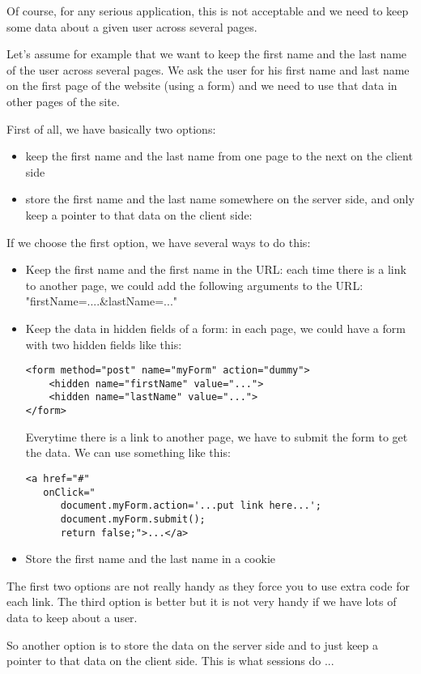 \documentclass{manual}
\begin{document}
Of course, for any serious application, this is not acceptable and we need to keep some data about a given user across
several pages.

Let's assume for example that we want to keep the first name and the last name of the user across several pages. We ask the
user for his first name and last name on the first page of the website (using a form) and we need to use that data in other
pages of the site.

First of all, we have basically two options:
\begin{itemize}
\item
keep the first name and the last name from one page to the next on the client side
\item
store the first name and the last name somewhere on the server side, and only keep
a pointer to that data on the client side: 
\end{itemize}

If we choose the first option, we have several ways to do this:
\begin{itemize}
\item
    Keep the first name and the first name in the URL: each time there is a link to another page, we could add the
    following arguments to the URL: "firstName=....\&lastName=..."
\item
Keep the data in hidden fields of a form: in each page, we could have a form with two hidden fields like this:
\begin{verbatim}
<form method="post" name="myForm" action="dummy">
    <hidden name="firstName" value="...">
    <hidden name="lastName" value="...">
</form>
\end{verbatim}
Everytime there is a link to another page, we have to submit the form to get the data. We can use something like this:
\begin{verbatim}
<a href="#"
   onClick="
      document.myForm.action='...put link here...';
      document.myForm.submit();
      return false;">...</a>
\end{verbatim}
\item
Store the first name and the last name in a cookie
\end{itemize}

The first two options are not really handy as they force you to use extra code for each link. The third option is better but
it is not very handy if we have lots of data to keep about a user.

So another option is to store the data on the server side and to just keep a pointer to that data on the client side. This
is what sessions do ...
\end{document}
